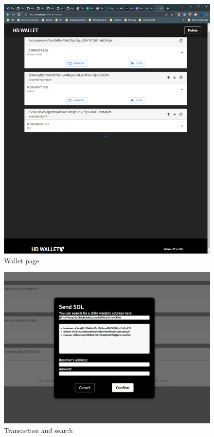   \begin{figure}[h!]
    \centering
    \includegraphics[width=1\textwidth]{images/Mainpage.png}
    \caption[Wallet page]{Wallet page}
    \label{fig:wallet}
  \end{figure}

  \begin{figure}[h!]
    \centering
    \includegraphics[width=1\textwidth]{images/search.png}
    \caption[Transaction and search]{Transaction and search}
    \label{fig:transactionandsearch}
  \end{figure}


